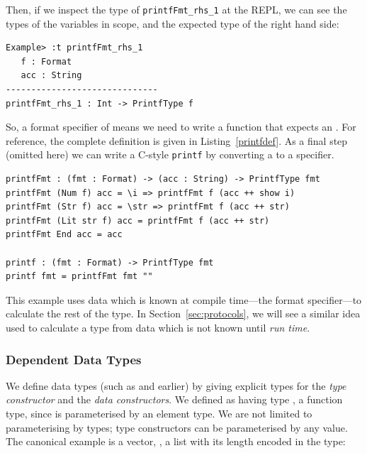 Then, if we inspect the type of \texttt{printfFmt\_rhs\_1} at the REPL, we
can see the types of the variables in scope, and the expected type of
the right hand side:

\begin{lstlisting}
Example> :t printfFmt_rhs_1
   f : Format
   acc : String
------------------------------
printfFmt_rhs_1 : Int -> PrintfType f
\end{lstlisting}

So, a format specifier of  means we need to write a function that
expects an . 
%
% 
%
For reference, the complete definition is given in Listing~\ref{printfdef}.
As a final step (omitted here) we can write a C-style \texttt{printf} by
converting a  to a  specifier.

\begin{lstlisting}[caption={The complete definition of \texttt{printf}},label=printfdef,float=h]
printfFmt : (fmt : Format) -> (acc : String) -> PrintfType fmt
printfFmt (Num f) acc = \i => printfFmt f (acc ++ show i)
printfFmt (Str f) acc = \str => printfFmt f (acc ++ str)
printfFmt (Lit str f) acc = printfFmt f (acc ++ str)
printfFmt End acc = acc
  
printf : (fmt : Format) -> PrintfType fmt
printf fmt = printfFmt fmt ""
\end{lstlisting}

This example uses data which is known at compile time---the format
specifier---to calculate the rest of the type. In Section~\ref{sec:protocols},
we will see a similar idea used to calculate a type from data which is not
known until \emph{run time}.

\subsubsection{Dependent Data Types}

We define data types (such as  and  earlier) by giving
explicit types for the \emph{type constructor} and the \emph{data
constructors}.
We defined  as having type , a function type, since
 is parameterised by an element type. We are
not limited to parameterising by types;
type constructors can be parameterised by any value. The canonical example
is a vector, , a list with its length encoded in the type:

